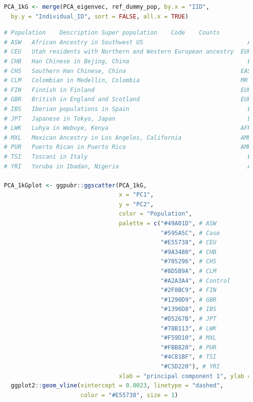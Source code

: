 \documentclass[
]{book}
\begin{document}
\begin{lstlisting}[language=R]
PCA_1kG <- merge(PCA_eigenvec, ref_dummy_pop, by.x = "IID",
  by.y = "Individual_ID", sort = FALSE, all.x = TRUE)
\end{lstlisting}

\begin{lstlisting}[language=R]
# Population    Description Super population    Code    Counts
# ASW   African Ancestry in Southwest US                              AFR   4     #49A01D
# CEU   Utah residents with Northern and Western European ancestry  EUR 7     #E55738
# CHB   Han Chinese in Bejing, China                                  EAS   8     #9A3480
# CHS   Southern Han Chinese, China                                 EAS 9     #705296
# CLM   Colombian in Medellin, Colombia                             MR  10  #8D5B9A
# FIN   Finnish in Finland                                          EUR 12  #2F8BC9
# GBR   British in England and Scotland                             EUR 13  #1290D9
# IBS   Iberian populations in Spain                                  EUR   16  #1396D8
# JPT   Japanese in Tokyo, Japan                                      EAS   18  #D5267B
# LWK   Luhya in Webuye, Kenya                                      AFR 20  #78B113
# MXL   Mexican Ancestry in Los Angeles, California                 AMR 22  #F59D10
# PUR   Puerto Rican in Puerto Rico                                 AMR 25  #FBB820
# TSI   Toscani in Italy                                              EUR   27  #4C81BF
# YRI   Yoruba in Ibadan, Nigeria                                     AFR   28  #C5D220

PCA_1kGplot <- ggpubr::ggscatter(PCA_1kG, 
                                 x = "PC1", 
                                 y = "PC2",
                                 color = "Population", 
                                 palette = c("#49A01D", # ASW 
                                             "#595A5C", # Case 
                                             "#E55738", # CEU 
                                             "#9A3480", # CHB 
                                             "#705296", # CHS 
                                             "#8D5B9A", # CLM 
                                             "#A2A3A4", # Control 
                                             "#2F8BC9", # FIN 
                                             "#1290D9", # GBR 
                                             "#1396D8", # IBS 
                                             "#D5267B", # JPT 
                                             "#78B113", # LWK 
                                             "#F59D10", # MXL 
                                             "#FBB820", # PUR 
                                             "#4C81BF", # TSI 
                                             "#C5D220"), # YRI
                                 xlab = "principal component 1", ylab = "principal component 2") +
  ggplot2::geom_vline(xintercept = 0.0023, linetype = "dashed",
                      color = "#E55738", size = 1)


\end{lstlisting}
\end{document}
